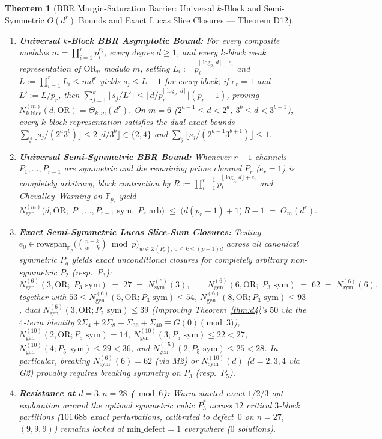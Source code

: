 \documentclass[11pt,a4paper]{article}
\newtheorem{theorem}{Theorem}[section]
\theoremstyle{definition}
\newcommand{\F}{\mathbb{F}}
\newcommand{\OR}{\mathrm{OR}}
\newcommand{\Nsym}{N_{\mathrm{sym}}}
\newcommand{\Ngen}{N_{\mathrm{gen}}}
\begin{document}
\begin{theorem}[BBR Margin-Saturation Barrier: Universal $k$-Block and Semi-Symmetric $O(d^r)$ Bounds and Exact Lucas Slice Closures --- Theorem D12]
\label{thm:d12}
\begin{enumerate}[leftmargin=*,nosep]
  \item \textbf{Universal $k$-Block BBR Asymptotic Bound:} For every composite modulus $m = \prod_{i=1}^r p_i^{e_i}$, every degree $d \ge 1$, and every $k$-block weak representation of $\OR_n$ modulo $m$, setting $L_i := p_i^{\lfloor \log_{p_i} d\rfloor + e_i}$ and $L := \prod_{i=1}^r L_i \le m d^r$ yields $s_j \le L - 1$ for every block; if $e_r = 1$ and $L' := L / p_r$, then $\sum_{j=1}^k \lfloor s_j / L' \rfloor \le \lfloor d / p_r^{\lfloor \log_{p_r} d\rfloor}\rfloor (p_r - 1)$, proving $N_{k\text{-bloc}}^{(m)}(d, \OR) = \Theta_{k,m}(d^r)$. On $m = 6$ ($2^{a-1} \le d < 2^a$, $3^b \le d < 3^{b+1}$), every $k$-block representation satisfies the dual exact bounds $\sum_j \lfloor s_j / (2^a 3^b)\rfloor \le 2\lfloor d / 3^b\rfloor \in \{2, 4\}$ and $\sum_j \lfloor s_j / (2^{a-1} 3^{b+1})\rfloor \le 1$.
  \item \textbf{Universal Semi-Symmetric BBR Bound:} Whenever $r - 1$ channels $P_1, \dots, P_{r-1}$ are symmetric and the remaining prime channel $P_r$ ($e_r = 1$) is \emph{completely arbitrary}, block contraction by $R := \prod_{i=1}^{r-1} p_i^{\lfloor \log_{p_i} d\rfloor + e_i}$ and Chevalley--Warning on $\F_{p_r}$ yield
  \[
    N_{\mathrm{gen}}^{(m)}\bigl(d, \OR;\; P_1,\dots,P_{r-1}\text{ sym},\; P_r\text{ arb}\bigr) \;\le\; \bigl(d(p_r - 1) + 1\bigr)\,R - 1 \;=\; O_m(d^r).
  \]
  \item \textbf{Exact Semi-Symmetric Lucas Slice-Sum Closures:} Testing $e_0 \in \mathrm{rowspan}_{\F_p}\bigl(\binom{n-k}{w-k} \bmod p\bigr)_{w \in Z(P_q),\, 0 \le k \le (p-1)d}$ across all canonical symmetric $P_q$ yields exact unconditional closures for \emph{completely arbitrary} non-symmetric $P_2$ (resp.\ $P_3$):
  \[
    \Ngen^{(6)}(3, \OR;\; P_3\text{ sym}) \;=\; 27 \;=\; \Nsym^{(6)}(3), \qquad
    \Ngen^{(6)}(6, \OR;\; P_3\text{ sym}) \;=\; 62 \;=\; \Nsym^{(6)}(6),
  \]
  together with $53 \le \Ngen^{(6)}(5, \OR; P_3\text{ sym}) \le 54$, $\Ngen^{(6)}(8, \OR; P_3\text{ sym}) \le 93$, dual $\Ngen^{(6)}(3, \OR; P_2\text{ sym}) \le 39$ (improving Theorem~\ref{thm:d4}'s $50$ via the $4$-term identity $2\Sigma_4 + 2\Sigma_8 + \Sigma_{36} + \Sigma_{40} \equiv G(0) \pmod 3$), $\Ngen^{(10)}(2, \OR; P_5\text{ sym}) = 14$, $\Ngen^{(10)}(3; P_5\text{ sym}) \le 22 < 27$, $\Ngen^{(10)}(4; P_5\text{ sym}) \le 29 < 36$, and $\Ngen^{(15)}(2; P_5\text{ sym}) \le 25 < 28$. In particular, breaking $\Nsym^{(6)}(6) = 62$ (via M2) or $\Nsym^{(10)}(d)$ ($d=2,3,4$ via G2) \emph{provably requires} breaking symmetry on $P_3$ (resp.\ $P_5$).
  \item \textbf{Resistance at $d = 3, n = 28$ ($\bmod 6$):} Warm-started exact $1/2/3$-opt exploration around the optimal symmetric cubic $P_3^*$ across $12$ critical $3$-block partitions ($101\,688$ exact perturbations, calibrated to defect~$0$ on $n = 27$, $(9,9,9)$) remains locked at $\mathrm{min\_defect} = 1$ everywhere ($0$ solutions).
\end{enumerate}
\end{theorem}
\end{document}

